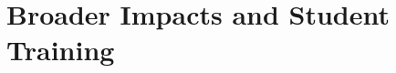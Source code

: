 \documentclass[oneside,11pt]{amsart}
\begin{document}



\section{Broader Impacts and Student Training}
\label{sec:bi}
\end{document}
